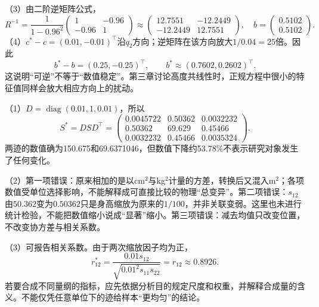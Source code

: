 （3）由二阶逆矩阵公式，
\[
R^{-1}=\frac1{1-0.96^2}\begin{pmatrix}1&-0.96\\-0.96&1\end{pmatrix}
\approx\begin{pmatrix}12.7551&-12.2449\\-12.2449&12.7551\end{pmatrix},
\quad b=\begin{pmatrix}0.5102\\0.5102\end{pmatrix}.
\]
（4）$c^*-c=(0.01,-0.01)^\top$沿$q_2$方向；逆矩阵在该方向放大$1/0.04=25$倍。因此
\[
b^*-b=(0.25,-0.25)^\top,\qquad b^*\approx(0.7602,0.2602)^\top.
\]
这说明“可逆”不等于“数值稳定”。第三章讨论高度共线性时，正规方程中很小的特征值同样会放大相应方向上的扰动。
\par\nobreak\smallskip{}

（1）$D=\operatorname{diag}(0.01,1,0.01)$，所以
\[
S^*=DSD^\top=
\begin{pmatrix}
0.0045722&0.50362&0.0032232\\
0.50362&69.629&0.45466\\
0.0032232&0.45466&0.0035324
\end{pmatrix}.
\]
两迹的数值确为150.675和69.6371046，但数值下降约53.78\%不表示研究对象发生了任何变化。

（2）第一项错误：原来相加的是以cm$^2$与kg$^2$计量的方差，转换后又混入m$^2$；各项数值受单位选择影响，不能解释成可直接比较的物理“总变异”。第二项错误：$s_{12}$由$50.362$变为$0.50362$只是身高缩放为原来的$1/100$，并非关联变弱。这里也未进行统计检验，不能把数值缩小说成“显著”缩小。第三项错误：减去均值只改变位置，不改变协方差与相关系数。

（3）可报告相关系数。由于两次缩放因子均为正，
\[
r^*_{12}=\frac{0.01s_{12}}{\sqrt{0.01^2s_{11}s_{22}}}=r_{12}\approx0.8926.
\]
若要合成不同量纲的指标，应先依据分析目的规定尺度和权重，并解释合成量的含义。不能仅凭任意单位下的迹给样本“更均匀”的结论。
\par\nobreak\smallskip{}

\EndExercises
